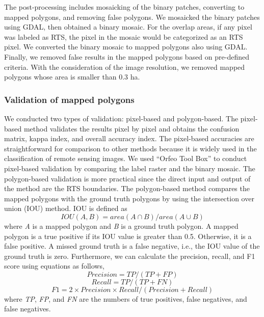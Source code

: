 \documentclass[preprint,12pt,authoryear]{elsarticle}
\begin{document}
The post-processing includes mosaicking of the binary patches, converting to mapped polygons, and removing false polygons. We mosaicked the binary patches using GDAL, then obtained a binary mosaic. For the overlap areas, if any pixel was labeled as RTS, the pixel in the mosaic would be categorized as an RTS pixel. We converted the binary mosaic to mapped polygons also using GDAL. Finally, we removed false results in the mapped polygons based on pre-defined criteria. With the consideration of the image resolution, we removed mapped polygons whose area is smaller than 0.3 ha.  

\subsubsection{Validation of mapped polygons}
\label{subsubsec_validation}

We conducted two types of validation: pixel-based and polygon-based. The pixel-based method validates the results pixel by pixel and obtains the confusion matrix, kappa index, and overall accuracy index. The pixel-based accuracies are straightforward for comparison to other methods because it is widely used in the classification of remote sensing images. We used ``Orfeo Tool Box'' \citep{inglada2009orfeo} to conduct pixel-based validation by comparing the label raster and the binary mosaic. The polygon-based validation is more practical since the direct input and output of the method are the RTS boundaries. The polygon-based method compares the mapped polygons with the ground truth polygons by using the intersection over union (IOU) method.  IOU is defined as 
\begin{equation}
IOU(A,B)=area(A \cap B)/area(A \cup B)
\label{equ_iou}
\end{equation}
where \emph{A} is a mapped polygon and \emph{B} is a ground truth polygon. A mapped polygon is a true positive if its IOU value is greater than 0.5. Otherwise, it is a false positive. A missed ground truth is a false negative, i.e., the IOU value of the ground truth is zero. Furthermore, we can calculate the precision, recall, and F1 score using equations as follows,
\begin{equation}
Precision=TP/(TP+FP)
\label{equ_precision}
\end{equation}
\begin{equation}
Recall=TP/(TP+FN)
\label{equ_recall}
\end{equation}
\begin{equation}
F1=2 \times Precision \times Recall / (Precision + Recall)
\label{equ_f1score}
\end{equation}
where \emph{TP}, \emph{FP}, and \emph{FN} are the numbers of true positives, false negatives, and false negatives. 
\end{document}
